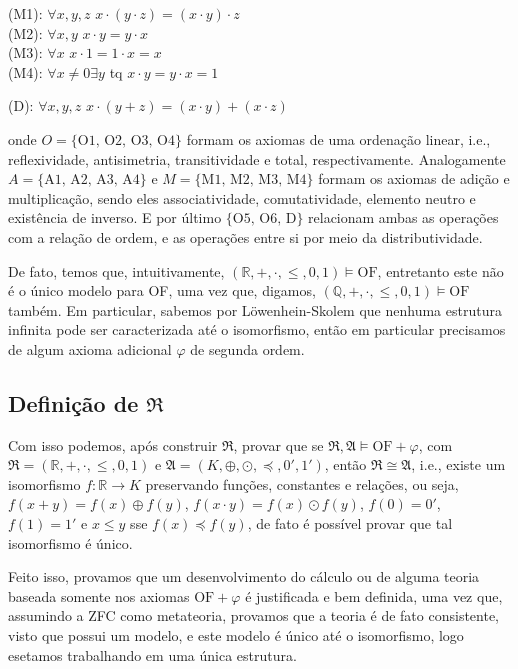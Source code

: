 \documentclass[11pt]{article}
\newcommand{\mf}[1]{\mathfrak{#1}}
\newcommand{\mbb}[1]{\mathbb{#1}}
\begin{document}
(M1): $\forall x,y,z$ $x\cdot(y\cdot z)=(x\cdot y)\cdot z$\\
(M2): $\forall x,y$ $x\cdot y=y\cdot x$\\
(M3): $\forall x$ $x\cdot1=1\cdot x=x$\\
(M4): $\forall x\neq0\exists y$ tq $x\cdot y=y\cdot x=1$

(D): $\forall x,y,z$ $x\cdot(y+z)=(x\cdot y)+(x\cdot z)$

onde $O=\{\text{O1, O2, O3, O4}\}$ formam os axiomas de uma ordenação linear, i.e., reflexividade, antisimetria, transitividade e total, respectivamente. Analogamente $A=\{\text{A1, A2, A3, A4}\}$ e $M=\{\text{M1, M2, M3, M4}\}$ formam os axiomas de adição e multiplicação, sendo eles associatividade, comutatividade, elemento neutro e existência de inverso. E por último $\{\text{O5, O6, D}\}$ relacionam ambas as operações com a relação de ordem, e as operações entre si por meio da distributividade.

De fato, temos que, intuitivamente, $(\mbb{R},+,\cdot,\leq,0,1)\vDash\text{OF}$, entretanto este não é o único modelo para OF, uma vez que, digamos, $(\mbb{Q},+,\cdot,\leq,0,1)\vDash\text{OF}$ também. Em particular, sabemos por Löwenhein-Skolem que nenhuma estrutura infinita pode ser caracterizada até o isomorfismo, então em particular precisamos de algum axioma adicional $\varphi$ de segunda ordem.

\subsection{Definição de $\mf{R}$}

Com isso podemos, após construir $\mf{R}$, provar que se $\mf{R},\mf{A}\vDash\text{OF}+\varphi$, com $\mf{R}=(\mbb{R},+,\cdot,\leq,0,1)$ e $\mf{A}=(K,\oplus,\odot,\preceq,0',1')$, então $\mf{R}\cong\mf{A}$, i.e., existe um isomorfismo $f:\mbb{R}\to K$ preservando funções, constantes e relações, ou seja, $f(x+y)=f(x)\oplus f(y)$, $f(x\cdot y)=f(x)\odot f(y)$, $f(0)=0'$, $f(1)=1'$ e $x\leq y$ sse $f(x)\preceq f(y)$, de fato é possível provar que tal isomorfismo é único.

Feito isso, provamos que um desenvolvimento do cálculo ou de alguma teoria baseada somente nos axiomas $\text{OF}+\varphi$ é justificada e bem definida, uma vez que, assumindo a ZFC como metateoria, provamos que a teoria é de fato consistente, visto que possui um modelo, e este modelo é único até o isomorfismo, logo esetamos trabalhando em uma única estrutura.
\end{document}

